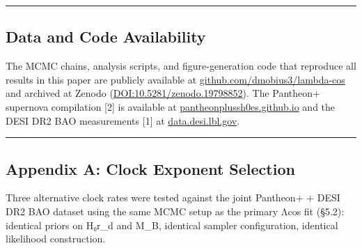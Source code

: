 \begin{center}\rule{0.5\linewidth}{0.5pt}\end{center}

\subsection{Data and Code
Availability}\label{data-and-code-availability}

The MCMC chains, analysis scripts, and figure-generation code that
reproduce all results in this paper are publicly available at
\href{https://github.com/dmobius3/lambda-cos}{github.com/dmobius3/lambda-cos}
and archived at Zenodo
(\href{https://doi.org/10.5281/zenodo.19798852}{DOI:10.5281/zenodo.19798852}).
The Pantheon+ supernova compilation {[}2{]} is available at
\href{https://pantheonplussh0es.github.io/}{pantheonplussh0es.github.io}
and the DESI DR2 BAO measurements {[}1{]} at
\href{https://data.desi.lbl.gov/}{data.desi.lbl.gov}.

\begin{center}\rule{0.5\linewidth}{0.5pt}\end{center}

\subsection{Appendix A: Clock Exponent
Selection}\label{appendix-a-clock-exponent-selection}

Three alternative clock rates were tested against the joint Pantheon+ +
DESI DR2 BAO dataset using the same MCMC setup as the primary Λcos fit
(§5.2): identical priors on H₀r\_d and M\_B, identical sampler
configuration, identical likelihood construction.

